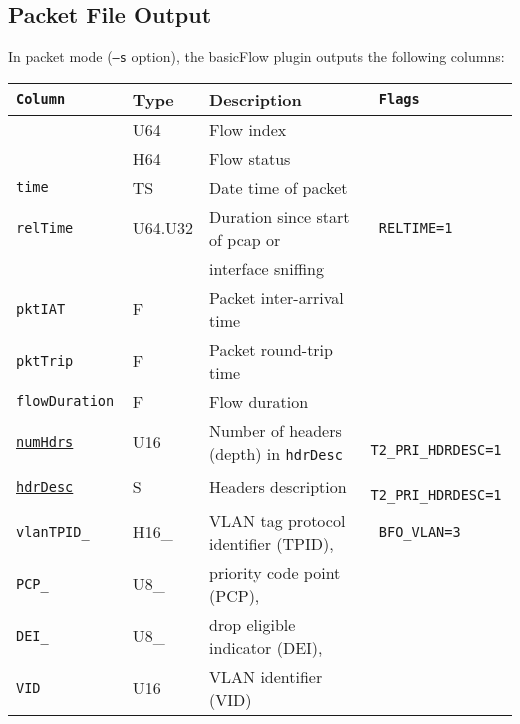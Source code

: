 \documentclass[documentation]{subfiles}
\begin{document}
\subsection{Packet File Output}
In packet mode ({\tt --s} option), the basicFlow plugin outputs the following columns:
\begin{longtable}{>{\tt}lll>{\tt\small}l}
    \toprule
    {\bf Column}                & {\bf Type}    & {\bf Description}                                  & {\bf Flags}\\
    \midrule\endhead%
    \nameref{flowInd}           & U64           & Flow index                                         & \\
    \nameref{flowStat}          & H64           & Flow status                                        & \\
    time                        & TS            & Date time of packet                                & \\
    relTime                     & U64.U32       & Duration since start of pcap or                    & RELTIME=1\\
                                &               & \qquad interface sniffing                          & \\
    pktIAT                      & F             & Packet inter-arrival time                          & \\
    pktTrip                     & F             & Packet round-trip time                             & \\
    flowDuration                & F             & Flow duration                                      & \\
    \hyperref[hdrDesc]{numHdrs} & U16           & Number of headers (depth) in {\tt hdrDesc}         & T2\_PRI\_HDRDESC=1\\
    \hyperref[hdrDesc]{hdrDesc} & S             & Headers description                                & T2\_PRI\_HDRDESC=1\\
    vlanTPID\_                  & H16\_         & VLAN tag protocol identifier (TPID),               & BFO\_VLAN=3\\
    \qquad PCP\_                & \qquad U8\_   & \qquad priority code point (PCP),                  & \\
    \qquad DEI\_                & \qquad U8\_   & \qquad drop eligible indicator (DEI),              & \\
    \qquad VID                  & \qquad U16    & \qquad VLAN identifier (VID)                       & \\

\end{longtable}
\end{document}
